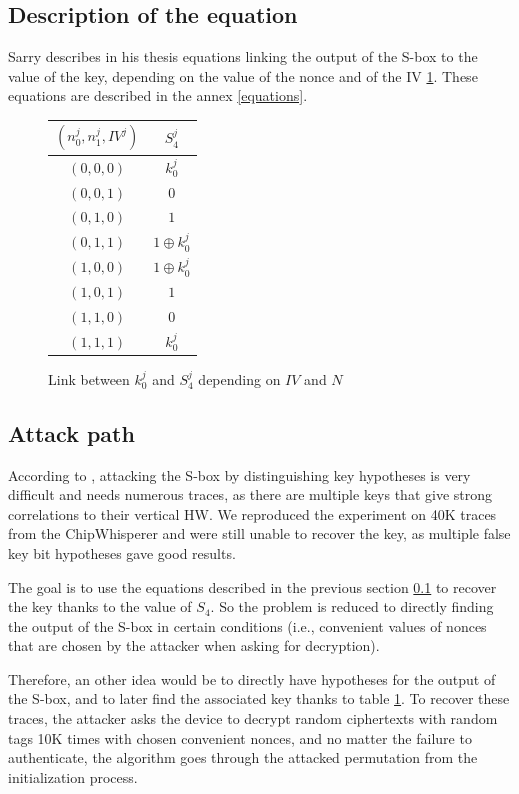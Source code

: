 \documentclass[11pt,technote]{IEEEtran}
\begin{document}
		\subsection{Description of the equation} \label{sec_equ}
		Sarry \cite{these} describes in his thesis equations linking the output of the S-box to the value of the key, depending on the value of the nonce and of the IV \ref{link_k_s4}. These equations are described in the annex \ref{equations}.
		
		\begin{figure}[h]
			\centering
			\begin{tabular}{|c|c|}
				\hline
				$(n_0^j,n_1^j,IV^j)$&$S_4^j$\\
				\hline\hline
				$(0,0,0)$&$k_0^j$\\
				\hline
				$(0,0,1)$&$0$\\
				\hline
				$(0,1,0)$&$1$\\
				\hline
				$(0,1,1)$&$1 \oplus k_0^j$\\
				\hline
				$(1,0,0)$&$1 \oplus k_0^j$\\
				\hline
				$(1,0,1)$&$1$\\
				\hline
				$(1,1,0)$&$0$\\
				\hline
				$(1,1,1)$&$k_0^j$\\
				\hline
			\end{tabular}
			\caption{Link between $k_0^j$ and $S_4^j$ depending on $IV$ and $N$}
			\label{link_k_s4}
		\end{figure}
		
		\subsection{Attack path}
		According to \cite{cpa_analysis}, attacking the S-box by distinguishing key hypotheses is very difficult and needs numerous traces, as there are multiple keys that give strong correlations to their vertical HW. We reproduced the experiment on 40K traces from the ChipWhisperer and were still unable to recover the key, as multiple false key bit hypotheses gave good results.
		
		The goal is to use the equations described in the previous section \ref{sec_equ} to recover the key thanks to the value of $S_4$. So the problem is reduced to directly finding the output of the S-box in certain conditions (i.e., convenient values of nonces that are chosen by the attacker when asking for decryption). 
		
		Therefore, an other idea would be to directly have hypotheses for the output of the S-box, and to later find the associated key thanks to table \ref{link_k_s4}. To recover these traces, the attacker asks the device to decrypt random ciphertexts with random tags 10K times with chosen convenient nonces, and no matter the failure to authenticate, the algorithm goes through the attacked permutation from the initialization process.
		
\end{document}
